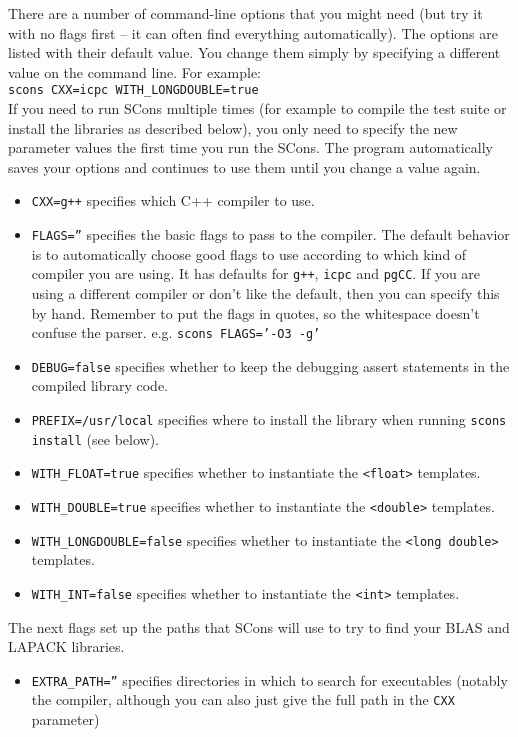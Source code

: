 \documentclass[twoside,letterpaper,11pt]{article}
\renewcommand{\tt}[1]{{\lstinline {#1}}}
\begin{document}
\begin{enumerate}
There are a number of command-line options that you might need (but try it with no flags
first -- it can often find everything automatically).  
The options are listed 
with their default value.  You change them simply by specifying a different value
on the command line.  For example:\\
\texttt{scons CXX=icpc WITH\_LONGDOUBLE=true}\\
If you need to run SCons multiple times (for example to compile the test suite or install
the libraries as described below), you only need to specify the new parameter values the first
time you run the SCons.
The program automatically saves your options and continues to use them until you
change a value again.
\begin{itemize}
\item \texttt{CXX=g++} specifies which C++ compiler to use.
\item \texttt{FLAGS=''} specifies the basic flags to pass to the compiler.  The default behavior is to
automatically choose good flags to use according to which kind of compiler you are using.
It has defaults for \texttt{g++}, \texttt{icpc} and \texttt{pgCC}.  If you are using a different compiler or don't
like the default, then you can specify this by hand.  
Remember to put the flags in quotes,
so the whitespace doesn't confuse the parser.  e.g. \texttt{scons FLAGS='-O3 -g'}
\item \texttt{DEBUG=false} specifies whether to keep the debugging assert statements in the compiled library code.  
\item \texttt{PREFIX=/usr/local} specifies where to install the library when running \texttt{scons install} (see below).
\item \texttt{WITH\_FLOAT=true} specifies whether to instantiate the \tt{<float>} templates.
\item \texttt{WITH\_DOUBLE=true} specifies whether to instantiate the \tt{<double>} templates.
\item \texttt{WITH\_LONGDOUBLE=false} specifies whether to instantiate the \tt{<long double>} templates.
\item \texttt{WITH\_INT=false} specifies whether to instantiate the \tt{<int>} templates.
\end{itemize}
The next flags set up the paths that SCons will use to try to find your BLAS and LAPACK libraries.
\begin{itemize}
\item \texttt{EXTRA\_PATH=''} specifies directories in which to search for executables (notably the compiler, although you can also just give the full path in the \texttt{CXX} parameter)

\end{itemize}
\end{enumerate}
\end{document}
